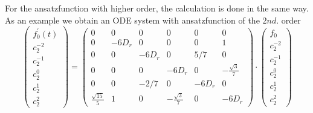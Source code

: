 \begin{frame}
	\scriptsize
	\centering
	For the ansatzfunction with higher order, the calculation is done in the same way. \\
	As an example we obtain an ODE system with ansatzfunction of the $2nd.$ order
	\begin{equation}
		\left(\begin{array}{c}
			f_0^{\prime}(t) \\
			c_2^{-2} \\
			c_2^{-1} \\
			c_2^0 \\
			c_2^1 \\
			c_2^2
		\end{array}\right)=\left(\begin{array}{cccccc}
			0 & 0 & 0 & 0 & 0 & 0 \\
			0 & -6 D_r & 0 & 0 & 0 & 1 \\
			0 & 0 & -6 D_r & 0 & 5/7 & 0 \\
			0 & 0 & 0 & -6 D_r & 0 & -\frac{\sqrt{3}}{7} \\
			0 & 0 & -2/7 & 0 & -6 D_r & 0 \\
			\frac{\sqrt{15}}{5} & 1 & 0 & -\frac{\sqrt{3}}{7} & 0 & -6 D_r
		\end{array}\right) \cdot\left(\begin{array}{c}
			f_0 \\
			c_2^{-2} \\
			c_2^{-1} \\
			c_2^0 \\
			c_2^1 \\
			c_2^2
		\end{array}\right)
	\end{equation}
\end{frame}

\begin{comment}
\begin{frame}
	\begin{table}[H]
		\scriptsize
		\begin{tabular}{|c|c|}
			\hline
			0th order	& 2nd order \\
			\hline
			& $P^{-2}_2 = \sqrt{\frac{15}{16\pi}}\sin^2(\theta)\cos(2\phi)$ \\
			& $P^{-1}_2 = \sqrt{\frac{15}{4\pi}}\sin(\theta)\cos(\theta)\cos(\phi)$ \\
			$P^0_0 = \sqrt{\frac{1}{4\pi}} \cdot 1$	& $P^0_2 = \sqrt{\frac{45}{16\pi}}\cos^2(\theta) - \frac{1}{3}$  \\
			&  $P^1_2 = \sqrt{\frac{15}{4\pi}}\sin(\theta)\cos(\theta)\sin(\phi)$\\
			&  $P^2_2 = \sqrt{\frac{15}{16\pi}}\sin^2(\theta)\sin(2\phi)$\\
			\hline
		\end{tabular}
		\caption{Normalized harmonic polynomial basis functions.}
	\end{table}
\end{frame}
\end{comment}

